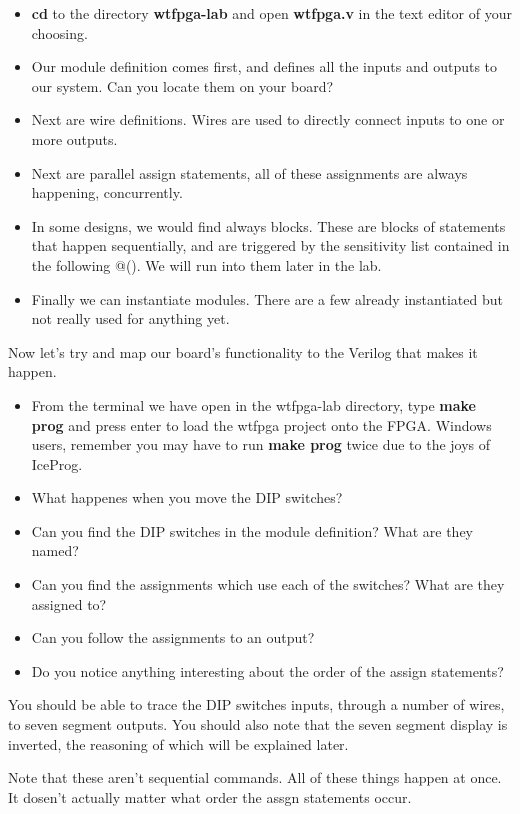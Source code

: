 \documentclass[12pt,a4paper]{article}
\begin{document}
\begin{itemize}
	\item \textbf{cd} to the directory \textbf{wtfpga-lab} and open \textbf{wtfpga.v} in the text editor of your choosing.
	\item Our module definition comes first, and defines all the inputs and outputs to our system. Can you locate them on your board?
	\item Next are wire definitions. Wires are used to	directly connect inputs to one or more outputs.
	\item Next are parallel assign statements, all of these assignments are always happening, concurrently. 
	\item In some designs, we would find always blocks. These are blocks of statements that happen sequentially, and are triggered by the sensitivity list contained in the following @(). We will run into them later in the lab.
	\item Finally we can instantiate modules. There are a few already instantiated but not really used for anything yet.
\end{itemize}
\noindent
Now let’s try and map our board’s functionality to the Verilog that makes it happen.
\begin{itemize}
	\item From the terminal we have open in the wtfpga-lab directory, type \textbf{make prog} and press enter to load the wtfpga project onto the FPGA. Windows users, remember you may have to run \textbf{make prog} twice due to the joys of IceProg. 
	\item What happenes when you move the DIP switches?
	\item Can you find the DIP switches in the module definition? What are they named?
	\item Can you find the assignments which use each of the switches? What are they assigned to?
	\item Can you follow the assignments to an output?
	\item Do you notice anything interesting about the order of the assign statements?
\end{itemize}
\noindent
You should be able to trace the DIP switches inputs, through a number of wires, to seven segment outputs. You should also note that the seven segment display is inverted, the reasoning of which will be explained later. 

Note that these aren't sequential commands. All of these things happen at once. It dosen't actually matter what order the assgn statements occur. 
\newpage
\end{document}

